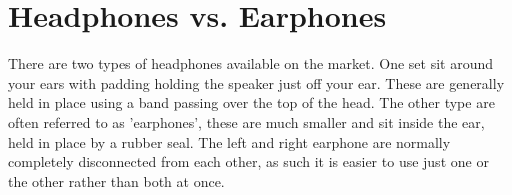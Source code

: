 \newpage
\section{Headphones vs. Earphones}
There are two types of headphones available on the market.
One set sit around your ears with padding holding the speaker just off your ear. These are generally held in place using a band passing over the top of the head.
The other type are often referred to as 'earphones', these are much smaller and sit inside the ear, held in place by a rubber seal. The left and right earphone are normally completely disconnected from each other, as such it is easier to use just one or the other rather than both at once.

